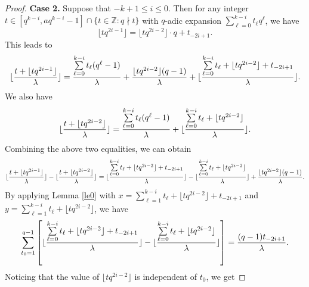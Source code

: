 \documentclass[journal,onecolumn]{IEEEtran}
\begin{document}
\begin{proof}
\textbf{Case 2.} Suppose that $-k+1\leq i\leq 0$. 
Then for any integer   $t\in \left[q^{k-i}, aq^{k-i}-1\right]\cap \{t\in \mathbb{Z}: q\nmid t\}$   with  $q$-adic expansion $\sum\limits_{\ell=0}^{k-i}t_{\ell}q^{\ell}$, 
we have 
\begin{equation}\label{lhx}
    \lfloor tq^{2i-1} \rfloor = \lfloor tq^{2i-2} \rfloor \cdot q+t_{-2i+1}. 
\end{equation}
This leads to 
\begin{equation}\notag
\begin{split}
    \lfloor \frac{t+\lfloor tq^{2i-1}\rfloor}{\lambda}\rfloor = \frac{ \sum\limits_{\ell=0}^{k-i}t_{\ell} (q^{\ell}-1)}{\lambda} + \frac{\lfloor tq^{2i-2}\rfloor(q-1)}{\lambda} +
    \lfloor  \frac{\sum\limits_{\ell=0}^{k-i}t_{\ell}+\lfloor tq^{2i-2}\rfloor+t_{-2i+1}}{\lambda} \rfloor. 
    \end{split}
\end{equation}   
We also have 
\begin{equation}\notag
\begin{split}
    \lfloor \frac{t+\lfloor tq^{2i-2}\rfloor}{\lambda}\rfloor = \frac{ \sum\limits_{\ell=0}^{k-i}t_{\ell} (q^{\ell}-1)}{\lambda} +  \lfloor  \frac{\sum\limits_{\ell=0}^{k-i}t_{\ell}+\lfloor tq^{2i-2}\rfloor}{\lambda} \rfloor. 
    \end{split}
    \end{equation}
Combining the above two equalities, we can obtain  \begin{equation}\notag
    \lfloor \frac{t+\lfloor tq^{2i-1} \rfloor}{\lambda}\rfloor-\lfloor \frac{t+\lfloor tq^{2i-2}\rfloor}{\lambda}\rfloor=   \lfloor  \frac{\sum\limits_{\ell=0}^{k-i}t_{\ell}+\lfloor tq^{2i-2}\rfloor+t_{-2i+1}}{\lambda} \rfloor 
     -\lfloor  \frac{\sum\limits_{\ell=0}^{k-i}t_{\ell}+\lfloor tq^{2i-2}\rfloor}{\lambda} \rfloor +\frac{\lfloor tq^{2i-2}\rfloor(q-1)}{\lambda}.
    \end{equation}
By applying Lemma \ref{le0} with $x=\sum\limits_{\ell=1}^{k-i}t_{\ell}+\lfloor tq^{2i-2}\rfloor+t_{-2i+1}$ and $ y= \sum\limits_{\ell=1}^{k-i}t_{\ell}+\lfloor tq^{2i-2}\rfloor
  $, we  have 
\begin{equation}\notag
\sum\limits_{t_0=1}^{q-1}
    \left[ \lfloor  \frac{\sum\limits_{\ell=0}^{k-i}t_{\ell}+\lfloor tq^{2i-2}\rfloor+t_{-2i+1}}{\lambda} \rfloor 
     -\lfloor  \frac{\sum\limits_{\ell=0}^{k-i}t_{\ell}+\lfloor tq^{2i-2}\rfloor}{\lambda} \rfloor \right]= \frac{(q-1)t_{-2i+1}}{\lambda}.
\end{equation}
Noticing that the value of $\lfloor tq^{2i-2}\rfloor$ is independent of $t_0$, we get 

\end{proof}
\end{document}
